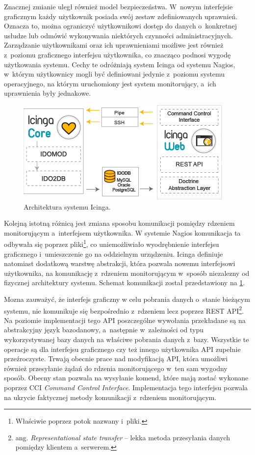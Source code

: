 Znacznej zmianie uległ również model bezpieczeństwa. W~nowym
interfejsie graficznym każdy użytkownik posiada swój zestaw
zdefiniowanych uprawnień. Oznacza to, można ograniczyć użytkownikowi
dostęp do danych o~konkretnej usłudze lub odmówić wykonywania
niektórych czynności administracyjnych. Zarządzanie użytkownikami oraz
ich uprawnieniami możliwe jest również z~poziomu graficznego
interfejsu użytkownika, co znacząco podnosi wygodę użytkowania
systemu. Cechy te odróżniają system Icinga od systemu Nagios, w~którym
użytkownicy mogli być definiowani jedynie z~poziomu systemu
operacyjnego, na którym uruchomiony jest system monitorujący, a~ich
uprawnienia były jednakowe.

\begin{figure}[ht]
  \caption{Architektura systemu Icinga.}
  \label{fig:IcingaOverview}
  \centering
\includegraphics{img/icingaOverview.png}
\end{figure}

Kolejną istotną różnicą jest zmiana sposobu komunikacji pomiędzy
rdzeniem monitorującym a~interfejsem użytkownika. W systemie Nagios
komunikacja ta odbywała się poprzez pliki\footnote{Właściwie poprzez
  potok nazwany i~pliki.}, co uniemożliwiało wyodrębnienie interfejsu
graficznego i~umieszczenie go na oddzielnym urządzeniu. Icinga
definiuje natomiast dodatkową warstwę abstrakcji, która pozwala nowemu
interfejsowi użytkownika, na komunikację z~rdzeniem monitorującym
w~sposób niezalezny od fizycznej architektury systemu. Schemat
komunikacji został przedstawiony na \ref{fig:IcingaOverview}.

Mozna zauważyć, że interfejs graficzny w celu pobrania danych o~stanie
bieżącym systemu, nie komunikuje się bezpośrednio z~rdzeniem lecz
poprzez REST API\footnote{ang. {\em Representational state transfer}
  -- lekka metoda przesyłania danych pomiędzy klientem
  a~serwerem.}. Na poziomie implementacji tego API poszczególne
wywołania przekładane są na abstrakcyjny język bazodanowy, a~następnie
w~zależności od typu wykorzystywanej bazy danych na właściwe pobrania
danych z~bazy. Wszystkie te operacje są dla interfejsu graficznego czy
też innego użytkownika API zupełnie przeźroczyste. Trwają obecnie
prace nad modyfikacją API, która umożliwi również przesyłanie żądań do
rdzenia monitorującego w~ten sam wygodny sposób. Obecny stan pozwala
na wysyłanie komend, które mają zostać wykonane poprzez CCI {\em
  Command Control Interface}. Implementacja tego interfejsu pozwala na
ukrycie faktycznej metody komunikacji z~rdzeniem monitorującym.

